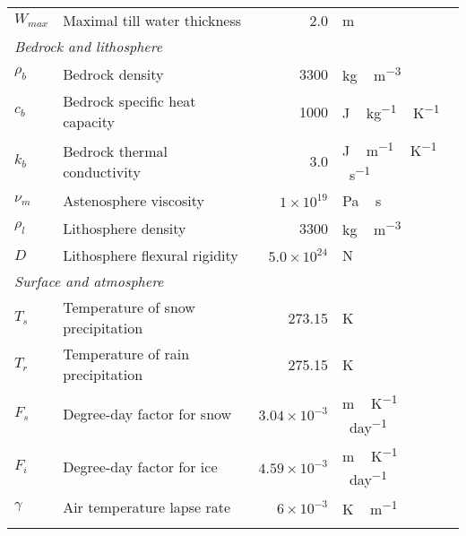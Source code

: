 \documentclass[tc, manuscript]{copernicus}
\begin{document}
\begin{table*}
{\begin{tabular}{llrl}
    $W_{max}$ & Maximal till water thickness
            & 2.0
            & m \\

    \multicolumn{2}{l}{\emph{Bedrock and lithosphere}} \\

    $\rho_b$& Bedrock density
            & 3300
            & \unit{kg\,m^{-3}} \\

    $c_b$   & Bedrock specific heat capacity
            & 1000
            & \unit{J\,kg^{-1}\,K^{-1}} \\

    $k_b$   & Bedrock thermal conductivity
            & 3.0
            & \unit{J\,m^{-1}\,K^{-1}\,s^{-1}} \\

    $\nu_m$ & Astenosphere viscosity
            & $1\times10^{19}$
            & \unit{Pa\,s} \\

    $\rho_l$& Lithosphere density
            & 3300
            & \unit{kg\,m^{-3}} \\

    $D$     & Lithosphere flexural rigidity
            & $5.0\times10^{24}$
            & \unit{N} \\

    \multicolumn{2}{l}{\emph{Surface and atmosphere}} \\

    $T_s$   & Temperature of snow precipitation
            & 273.15
            & \unit{K} \\

    $T_r$   & Temperature of rain precipitation
            & 275.15
            & \unit{K} \\

    $F_s$   & Degree-day factor for snow
            & $3.04\times10^{-3}$
            & \unit{m\,K^{-1}\,day^{-1}} \\

    $F_i$   & Degree-day factor for ice
            & $4.59\times10^{-3}$
            & \unit{m\,K^{-1}\,day^{-1}} \\

    $\gamma$& Air temperature lapse rate
            & $6\times10^{-3}$
            & \unit{K\,m^{-1}} \\

    \bottomhline
  \end{tabular}}
  \belowtable{}
\end{table*}
\end{document}
